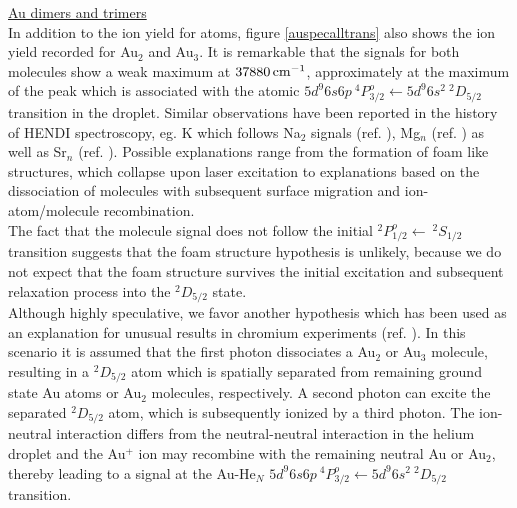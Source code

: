 \documentclass[parskip,12pt,headsepline,a4paper] {scrbook}
\begin{document}
\vspace{1cm}
\underline{Au dimers and trimers} \\
In addition to the ion yield for atoms, figure \ref{auspecalltrans} also shows the ion yield recorded for Au$_2$ and Au$_3$. It is remarkable that the signals for both molecules show a weak maximum at $\unit[37880]{cm^{-1}}$, approximately at the maximum of the peak which is associated with the atomic $5d^9 6s 6p \ ^4P^o_{3/2} \leftarrow 5d^9 6s^2 \ ^2D_{5/2}$ transition in the droplet. Similar observations have been reported in the history of HENDI spectroscopy, eg. K which follows Na$_2$ signals (ref. \cite{higgins}), Mg$_n$ (ref. \cite{mgn}) as well as Sr$_n$ (ref. \cite{bunermann-doc}). Possible explanations range from the formation of foam like structures, which collapse upon laser excitation to explanations based on the dissociation of molecules with subsequent surface migration and ion- atom/molecule recombination. \\
The fact that the molecule signal does not follow the initial $^2P^o_{1/2} \leftarrow \ ^2S_{1/2}$ transition suggests that the foam structure hypothesis is unlikely, because we do not expect that the foam structure survives the initial excitation and subsequent relaxation process into the $^2D_{5/2}$ state. \\
Although highly speculative, we favor another hypothesis which has been used as an explanation for unusual results in chromium experiments (ref. \cite{paperkautschkoch}). In this scenario it is assumed that the first photon dissociates a Au$_2$ or Au$_3$ molecule, resulting in a $^2D_{5/2}$ atom which is spatially separated from remaining ground state Au atoms or Au$_2$ molecules, respectively. A second photon can excite the separated $^2D_{5/2}$ atom, which is subsequently ionized by a third photon. The ion-neutral interaction differs from the neutral-neutral interaction in the helium droplet and the Au$^+$ ion may recombine with the remaining neutral Au or Au$_2$, thereby leading to a signal at the Au-He$_N$ $5d^9 6s 6p \ ^4P^o_{3/2} \leftarrow 5d^9 6s^2 \ ^2D_{5/2}$ transition.
\end{document}
